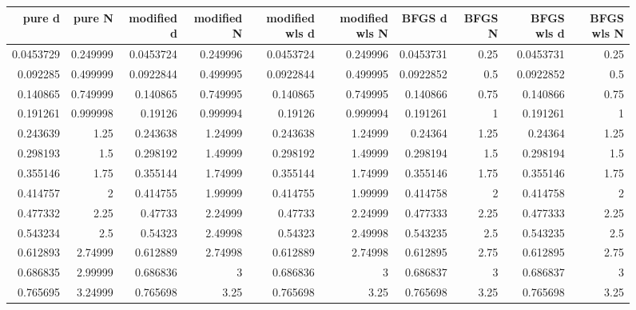 \documentclass[10pt,letterpaper]{article}
\begin{document}
\begin{figure}
\begin{tabular}{rrrrrrrrrr}
\hline
    pure d &    pure N &   modified d &   modified N &   modified wls d &   modified wls N &    BFGS d &   BFGS N &   BFGS wls d &   BFGS wls N \\
\hline
 0.0453729 &  0.249999 &    0.0453724 &     0.249996 &        0.0453724 &         0.249996 & 0.0453731 &  0.25    &    0.0453731 &      0.25    \\
 0.092285  &  0.499999 &    0.0922844 &     0.499995 &        0.0922844 &         0.499995 & 0.0922852 &  0.5     &    0.0922852 &      0.5     \\
 0.140865  &  0.749999 &    0.140865  &     0.749995 &        0.140865  &         0.749995 & 0.140866  &  0.75    &    0.140866  &      0.75    \\
 0.191261  &  0.999998 &    0.19126   &     0.999994 &        0.19126   &         0.999994 & 0.191261  &  1       &    0.191261  &      1       \\
 0.243639  &  1.25     &    0.243638  &     1.24999  &        0.243638  &         1.24999  & 0.24364   &  1.25    &    0.24364   &      1.25    \\
 0.298193  &  1.5      &    0.298192  &     1.49999  &        0.298192  &         1.49999  & 0.298194  &  1.5     &    0.298194  &      1.5     \\
 0.355146  &  1.75     &    0.355144  &     1.74999  &        0.355144  &         1.74999  & 0.355146  &  1.75    &    0.355146  &      1.75    \\
 0.414757  &  2        &    0.414755  &     1.99999  &        0.414755  &         1.99999  & 0.414758  &  2       &    0.414758  &      2       \\
 0.477332  &  2.25     &    0.47733   &     2.24999  &        0.47733   &         2.24999  & 0.477333  &  2.25    &    0.477333  &      2.25    \\
 0.543234  &  2.5      &    0.54323   &     2.49998  &        0.54323   &         2.49998  & 0.543235  &  2.5     &    0.543235  &      2.5     \\
 0.612893  &  2.74999  &    0.612889  &     2.74998  &        0.612889  &         2.74998  & 0.612895  &  2.75    &    0.612895  &      2.75    \\
 0.686835  &  2.99999  &    0.686836  &     3        &        0.686836  &         3        & 0.686837  &  3       &    0.686837  &      3       \\
 0.765695  &  3.24999  &    0.765698  &     3.25     &        0.765698  &         3.25     & 0.765698  &  3.25    &    0.765698  &      3.25    \\

\end{tabular}
\end{figure}
\end{document}
